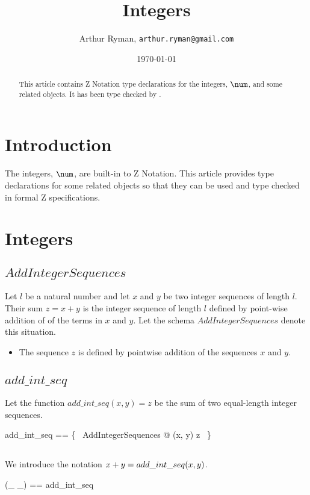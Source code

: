 \documentclass[11pt, oneside]{article}
\title{Integers}
\author{Arthur Ryman, {\tt arthur.ryman@gmail.com}}
\date{\today}
\begin{document}
\maketitle

\begin{abstract}
This article contains Z Notation type declarations for the integers, $\num$, and some related objects.
It has been type checked by \fuzz.
\end{abstract}

\section{Introduction}

The integers, $\num$, are built-in to Z Notation.
This article provides type declarations for some related objects so that they can be used and type checked in formal Z specifications.

\section{Integers}

\subsection{$AddIntegerSequences$}

Let $l$ be a natural number and
let $x$ and $y$ be two integer sequences of length $l$.
Their sum $z = x + y$ is the integer sequence of length $l$ defined by point-wise addition of 
of the terms in $x$ and $y$.
Let the schema $AddIntegerSequences$ denote this situation.

\begin{itemize}
	\item The sequence $z$ is defined by pointwise addition of the sequences $x$ and $y$.
\end{itemize}

\subsection{$add\_int\_seq$}

Let the function $add\_int\_seq(x, y) = z$ be the sum of two equal-length integer sequences.

\begin{zed}
	add\_int\_seq == \{~ AddIntegerSequences @ (x, y) \mapsto z ~\}
\end{zed}

\subsection{}

We introduce the notation $x \mathbin{+} y = add\_int\_seq(x, y)$.

\begin{zed}
	(\_ \addSeqZ \_) == add\_int\_seq
\end{zed}

\printbibliography
\end{document}
